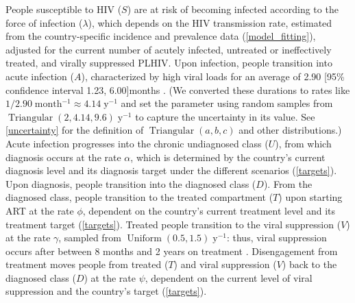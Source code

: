 \documentclass{article}
\DeclareMathOperator{\Uniform}{Uniform}
\DeclareMathOperator{\Triangular}{Triangular}
\begin{document}
People susceptible to HIV ($S$) are at risk of becoming infected
according to the force of infection ($\lambda$), which depends on the
HIV transmission rate, estimated from the country-specific incidence
and prevalence data (\autoref{model_fitting}), adjusted for the
current number of acutely infected, untreated or ineffectively
treated, and virally suppressed PLHIV.  Upon infection, people
transition into acute infection ($A$), characterized by high viral
loads for an average of 2.90 [95\% confidence interval 1.23,
6.00]\;months \cite{Hollingsworth2008-iy}.  (We converted these
durations to rates like $1 / 2.90\;\text{month$^{-1}$} \approx
4.14\;\text{y$^{-1}$}$ and set the parameter using random samples from
$\Triangular(2, 4.14, 9.6)\;\text{y$^{-1}$}$ to capture the
uncertainty in its value.  See \autoref{uncertainty} for the
definition of $\Triangular(a, b, c)$ and other distributions.)  Acute
infection progresses into the chronic undiagnosed class ($U$), from
which diagnosis occurs at the rate $\alpha$, which is determined by
the country's current diagnosis level and its diagnosis target under
the different scenarios (\autoref{targets}).  Upon diagnosis, people
transition into the diagnosed class ($D$).  From the diagnosed class,
people transition to the treated compartment ($T$) upon starting ART
at the rate $\phi$, dependent on the country's current treatment level
and its treatment target (\autoref{targets}).  Treated people
transition to the viral suppression ($V$) at the rate $\gamma$,
sampled from $\Uniform(0.5, 1.5)\;\text{y$^{-1}$}$: thus, viral
suppression occurs after between 8 months and 2 years on
treatment \cite{Currie2009-yz}.  Disengagement from treatment moves
people from treated ($T$) and viral suppression ($V$) back to the
diagnosed class ($D$) at the rate $\psi$, dependent on the current
level of viral suppression and the country's target
(\autoref{targets}).
\end{document}

